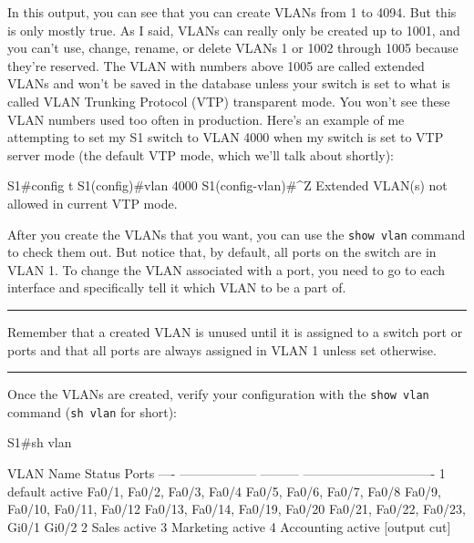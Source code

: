 In this output, you can see that you can create VLANs from 1 to 4094.
But this is only mostly true. As I said, VLANs can really only be
created up to 1001, and you can't use, change, rename, or delete VLANs 1
or 1002 through 1005 because they're reserved. The VLAN with numbers
above 1005 are called extended VLANs and won't be saved in the database
unless your switch is set to what is called VLAN Trunking Protocol (VTP)
transparent mode. You won't see these VLAN numbers used too often in
production. Here's an example of me attempting to set my S1 switch to
VLAN 4000 when my switch is set to VTP server mode (the default VTP
mode, which we'll talk about shortly):

\begin{cli}
S1#config t
S1(config)#vlan 4000
S1(config-vlan)#^Z
Extended VLAN(s) not allowed in current VTP mode.
\end{cli}

After you create the VLANs that you want, you can use the
\texttt{show\ vlan} command to check them out.
But notice that, by default, all ports on the switch are in VLAN 1.
To change the VLAN associated with a port, you need to go to each interface and specifically tell it which VLAN to be a part of.

\begin{center}\rule{0.5\linewidth}{0.5pt}\end{center}

Remember that a created VLAN is unused
until it is assigned to a switch port or ports and that all ports are
always assigned in VLAN 1 unless set otherwise.

\begin{center}\rule{0.5\linewidth}{0.5pt}\end{center}

Once the VLANs are created, verify your configuration with the
\texttt{show\ vlan} command (\texttt{sh\ vlan} for short):

\begin{cli}
S1#sh vlan

VLAN Name               Status    Ports
---- ------------------ --------- -------------------------------
1    default            active    Fa0/1, Fa0/2, Fa0/3, Fa0/4
                                  Fa0/5, Fa0/6, Fa0/7, Fa0/8
                                  Fa0/9, Fa0/10, Fa0/11, Fa0/12
                                  Fa0/13, Fa0/14, Fa0/19, Fa0/20
                                  Fa0/21, Fa0/22, Fa0/23, Gi0/1
                                  Gi0/2
2    Sales              active
3    Marketing          active
4    Accounting         active
[output cut]
\end{cli}

